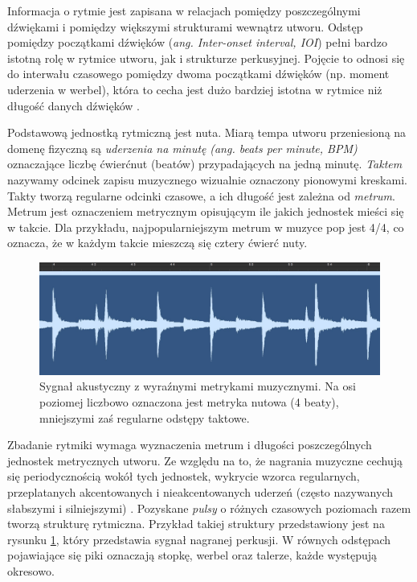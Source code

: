 \documentclass[12pt,a4paper,twoside]{mwart}
\begin{document}
Informacja o rytmie jest zapisana w relacjach pomiędzy poszczególnymi dźwiękami i pomiędzy większymi strukturami wewnątrz utworu. Odstęp pomiędzy początkami dźwięków (\textit{ang. Inter-onset interval, IOI}) pełni bardzo istotną rolę w rytmice utworu, jak i strukturze perkusyjnej. Pojęcie to odnosi się do interwału czasowego pomiędzy dwoma początkami dźwięków (np. moment uderzenia w werbel), która to cecha jest dużo bardziej istotna w rytmice niż długość danych dźwięków 
\cite[482-489]{Transcription:Clarke:RhythmAndTiming}
.

Podstawową jednostką rytmiczną jest nuta. Miarą tempa utworu przeniesioną na domenę fizyczną są \textit{uderzenia na minutę} \textit{(ang. beats per minute, BPM)} oznaczające liczbę ćwierćnut (beatów) przypadających na jedną minutę. \textit{Taktem} nazywamy odcinek zapisu muzycznego wizualnie oznaczony pionowymi kreskami. Takty tworzą regularne odcinki czasowe, a ich długość jest zależna od \textit{metrum}. Metrum jest oznaczeniem metrycznym opisującym ile jakich jednostek mieści się w takcie. Dla przykładu, najpopularniejszym metrum w muzyce pop jest 4/4, co oznacza, że w każdym takcie mieszczą się cztery ćwierć nuty.

\begin{figure}[H]
  \begin{center}
    \includegraphics[scale=0.3]{images/RythmMertic.jpg}
    \caption{Sygnał akustyczny z wyraźnymi metrykami muzycznymi. Na osi poziomej liczbowo oznaczona jest metryka nutowa (4 beaty), mniejszymi zaś regularne odstępy taktowe.}
    \label{fig:rythmMertic}
  \end{center}
\end{figure}

Zbadanie rytmiki wymaga wyznaczenia metrum i długości poszczególnych jednostek metrycznych utworu. Ze względu na to, że nagrania muzyczne cechują się periodycznością wokół tych jednostek, wykrycie wzorca regularnych, przeplatanych akcentowanych i nieakcentowanych uderzeń (często nazywanych słabszymi i silniejszymi) 
\cite[12-35]{Transcription:Lerdahl:GenerativeTheory}
. Pozyskane \textit{pulsy} o różnych czasowych poziomach razem tworzą strukturę rytmiczna. Przykład takiej struktury przedstawiony jest na rysunku \ref{fig:rythmMertic}, który przedstawia sygnał nagranej perkusji. W równych odstępach pojawiające się piki oznaczają stopkę, werbel oraz talerze, każde występują okresowo.
\end{document}
